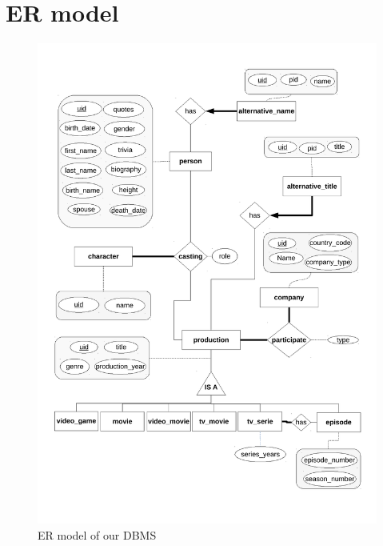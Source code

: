 \documentclass{article}
\begin{document}


\section{ER model}
    \begin{figure}[H]
        \includegraphics[width=\linewidth]{Diagrame_ER.pdf}
        \captionsetup{justification=centering}
        \caption{ER model of our DBMS}
    \end{figure}
\end{document}
